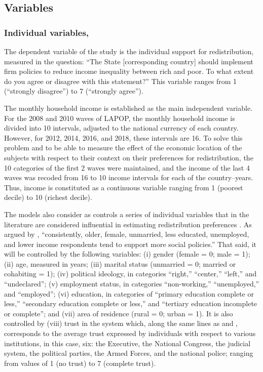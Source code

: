 \documentclass[utf8]{frontiersSCNS} %
\begin{document}
\subsection{Variables}

\subsubsection{Individual variables,}

The dependent variable of the study is the individual support for redistribution, measured in the question: “The State [corresponding country] should implement firm policies to reduce income inequality between rich and poor. To what extent do you agree or disagree with this statement?” This variable ranges from 1 (“strongly disagree”) to 7 (“strongly agree”).

The monthly household income is established as the main independent variable. For the 2008 and 2010 waves of LAPOP, the monthly household income is divided into 10 intervals, adjusted to the national currency of each country. However, for 2012, 2014, 2016, and 2018, these intervals are 16. To solve this problem and to be able to measure the effect of the economic location of the subjects with respect to their context on their preferences for redistribution, the 10 categories of the first 2 waves were maintained, and the income of the last 4 waves was recoded from 16 to 10 income intervals for each of the country–years. Thus, income is constituted as a continuous variable ranging from 1 (poorest decile) to 10 (richest decile).

The models also consider as controls a series of individual variables that in the literature are considered influential in estimating redistribution preferences \parencite{CastilloRedistributiveConflictsPreferences2010}. As argued by \textcite[p.~21]{BradyDoesImmigrationUndermine2014}, “consistently, older, female, unmarried, less educated, unemployed, and lower income respondents tend to support more social policies.” That said, it will be controlled by the following variables: (i) gender (female = 0; male = 1); (ii) age, measured in years; (iii) marital status (unmarried = 0; married or cohabiting = 1); (iv) political ideology, in categories “right,” “center,” “left,” and “undeclared”; (v) employment status, in categories “non-working,” “unemployed,” and “employed”; (vi) education, in categories of “primary education complete or less,” “secondary education complete or less,” and “tertiary education incomplete or complete”; and (vii) area of residence (rural = 0; urban = 1). It is also controlled by (viii) trust in the system which, along the same lines as \textcite{Brandtdisadvantagedlegitimizesocial2013} and \textcite{CichockaWhatInvertedCan2017}, corresponds to the average trust expressed by individuals with respect to various institutions, in this case, six: the Executive, the National Congress, the judicial system, the political parties, the Armed Forces, and the national police; ranging from values of 1 (no trust) to 7 (complete trust).
\end{document}
